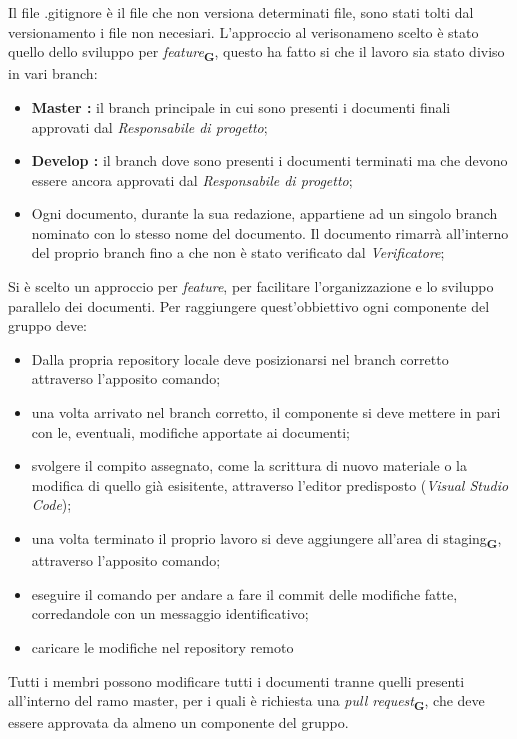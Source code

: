         Il file {\selectfont .gitignore} è il file che non versiona determinati file, sono stati tolti dal versionamento i file non necesiari.
        L'approccio al verisonameno scelto è stato quello dello sviluppo per \textit{feature}\textsubscript{\textbf{G}}, questo ha fatto si che il lavoro sia stato diviso in vari branch:
        \begin{itemize}
            \item \textbf{Master :} il branch principale in cui sono presenti i documenti finali approvati dal \textit{Responsabile di progetto};
            \item \textbf{Develop :} il branch dove sono presenti i documenti terminati ma che devono essere ancora approvati dal \textit{Responsabile di progetto};
            \item Ogni documento, durante la sua redazione, appartiene ad un singolo branch nominato con lo stesso nome del documento. Il documento rimarrà all'interno del proprio branch fino a che non è stato verificato dal \textit{Verificatore};
        \end{itemize}
        Si è scelto un approccio per \textit{feature}, per facilitare l'organizzazione e lo sviluppo parallelo dei documenti. Per raggiungere quest'obbiettivo ogni componente del gruppo deve:
        \begin{itemize}
            \item Dalla propria repository locale deve posizionarsi nel branch corretto attraverso l'apposito comando;
            \item una volta arrivato nel branch corretto, il componente si deve mettere in pari con le, eventuali, modifiche apportate ai documenti;
            \item svolgere il compito assegnato, come la scrittura di nuovo materiale o la modifica di quello già esisitente, attraverso l'editor predisposto (\textit{Visual Studio Code});
            \item una volta terminato il proprio lavoro si deve aggiungere all'area di staging\textsubscript{\textbf{G}}, attraverso l'apposito comando;
            \item eseguire il comando per andare a fare il commit delle modifiche fatte, corredandole con un messaggio identificativo;
            \item caricare le modifiche nel repository remoto 
        \end{itemize}
        Tutti i membri possono modificare tutti i documenti tranne quelli presenti all'interno del ramo master, per i quali è richiesta una \textit{pull request}\textsubscript{\textbf{G}}, che deve essere approvata da almeno un componente del gruppo.
